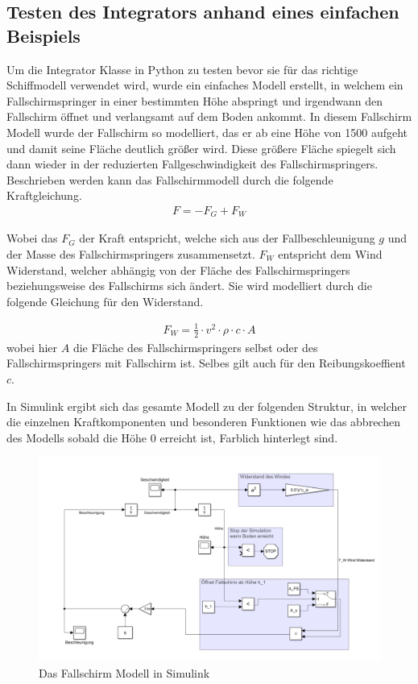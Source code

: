 \documentclass[]{iat}
\begin{document}
\subsection{Testen des Integrators anhand eines einfachen Beispiels} \label{sec:integrator_test}
Um die Integrator Klasse in Python zu testen bevor sie für das richtige Schiffmodell verwendet wird, wurde ein einfaches Modell erstellt, in welchem ein Fallschirmspringer in einer bestimmten Höhe abspringt und irgendwann den Fallschirm öffnet und verlangsamt auf dem Boden ankommt. In diesem Fallschirm Modell wurde der Fallschirm so modelliert, das er ab eine Höhe von 1500 aufgeht und damit seine Fläche deutlich größer wird. Diese größere Fläche spiegelt sich dann wieder in der reduzierten Fallgeschwindigkeit des Fallschirmspringers. Beschrieben werden kann das Fallschirmmodell durch die folgende Kraftgleichung.
\begin{align*}
    F = -F_G + F_W
\end{align*}

Wobei das $F_G$ der Kraft entspricht, welche sich aus der Fallbeschleunigung $g$ und der Masse des Fallschirmspringers zusammensetzt. $F_W$ entspricht dem Wind Widerstand, welcher abhängig von der Fläche des Fallschirmspringers beziehungsweise des Fallschirms sich ändert. Sie wird modelliert durch die folgende Gleichung für den Widerstand.

\begin{align*}
    F_W = \frac{1}{2} \cdot v^2 \cdot \rho \cdot c \cdot A
\end{align*}
wobei hier $A$ die Fläche des Fallschirmspringers selbst oder des Fallschirmspringers mit Fallschirm ist. Selbes gilt auch für den Reibungskoeffient $c$.

In Simulink ergibt sich das gesamte Modell zu der folgenden Struktur, in welcher die einzelnen Kraftkomponenten und besonderen Funktionen wie das abbrechen des Modells sobald die Höhe 0 erreicht ist, Farblich hinterlegt sind.

\begin{figure}[H]
    \includegraphics[width=\textwidth]{graphics/parachute_simulink.png}
    \centering
    \caption{Das Fallschirm Modell in Simulink}
    \label{abb:parachute_simulink}
\end{figure}
\end{document}
